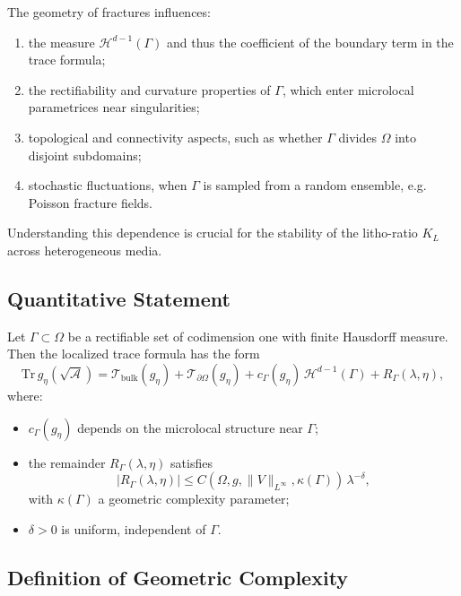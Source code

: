 The geometry of fractures influences:

\begin{enumerate}
  \item the measure $\mathcal{H}^{d-1}(\Gamma)$ and thus the coefficient
  of the boundary term in the trace formula;
  \item the rectifiability and curvature properties of $\Gamma$, which
  enter microlocal parametrices near singularities;
  \item topological and connectivity aspects, such as whether $\Gamma$
  divides $\Omega$ into disjoint subdomains;
  \item stochastic fluctuations, when $\Gamma$ is sampled from a random
  ensemble, e.g. Poisson fracture fields.
\end{enumerate}

Understanding this dependence is crucial for the stability of the
litho-ratio $K_L$ across heterogeneous media.

\subsection{Quantitative Statement}

\begin{theorem}
\label{thm:fracture-geometry}
Let $\Gamma \subset \Omega$ be a rectifiable set of codimension one with
finite Hausdorff measure. Then the localized trace formula has the form
\[
\mathrm{Tr}\, g_\eta(\sqrt{\mathcal{A}}) =
\mathcal{T}_{\mathrm{bulk}}(g_\eta) +
\mathcal{T}_{\partial \Omega}(g_\eta) +
c_\Gamma(g_\eta)\, \mathcal{H}^{d-1}(\Gamma) +
R_\Gamma(\lambda,\eta),
\]
where:
\begin{itemize}
  \item $c_\Gamma(g_\eta)$ depends on the microlocal structure near $\Gamma$;
  \item the remainder $R_\Gamma(\lambda,\eta)$ satisfies
  \[
  |R_\Gamma(\lambda,\eta)| \leq
  C(\Omega,g,\|V\|_{L^\infty}, \kappa(\Gamma))\,
  \lambda^{-\delta},
  \]
  with $\kappa(\Gamma)$ a geometric complexity parameter;
  \item $\delta>0$ is uniform, independent of $\Gamma$.
\end{itemize}
\end{theorem}

\subsection{Definition of Geometric Complexity}

